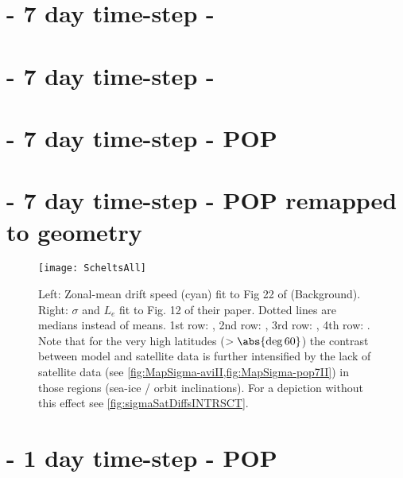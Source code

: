 \label{chap:results}


\section{\MI\;- 7 day time-step - \AVI}
\label{section:aviI}

\FloatBarrier

\section{\MII\;- 7 day time-step - \AVI}
\label{section:aviII}

\FloatBarrier

\section{\MII\;- 7 day time-step - POP}
\label{section:pop7II}

\FloatBarrier

\section{\MII\;- 7 day time-step - POP remapped to \AVI geometry}
\label{section:p2aII}

\FloatBarrier


\begin{figure}
\texttt{[image: ScheltsAll]}
\caption{
Left: Zonal-mean drift speed (cyan) fit to Fig 22 of  (Background).
Right: $\sigma$ and $L_{e}$ fit to Fig. 12 of their paper. Dotted lines are medians instead of means.
1st row: \protect{\aviII},
2nd row: \protect{\aviI},
3rd row: \protect{\pToaII},
4th row: \protect{\popSevenII}.
Note that for the very high latitudes ($>\abs{\deg{60}}$) the contrast between model and satellite data is further intensified by the lack of satellite data (see \cref{fig:MapSigma-aviII,fig:MapSigma-pop7II}) in those regions (sea-ice / orbit inclinations).
For a depiction without this effect see \cref{fig:sigmaSatDiffsINTRSCT}.
}
\label{fig:ScheltsAll}
\end{figure}


\section{\MII\;- 1 day time-step - POP}
\label{section:pop1ISO}
